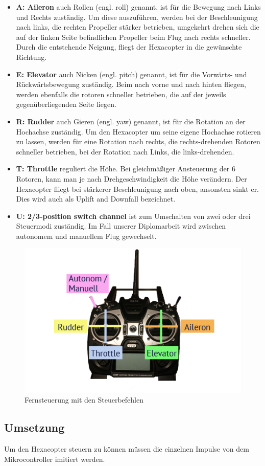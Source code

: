       \begin{itemize}
        \item \textbf{A: Aileron} auch Rollen (engl. roll) genannt, ist für die Bewegung nach Links und Rechts zuständig.
        Um diese auszuführen, werden bei der Beschleunigung nach links, die rechten Propeller stärker betrieben, umgekehrt drehen sich die auf der linken Seite befindlichen Propeller beim Flug nach rechts schneller. Durch die entstehende Neigung, fliegt der Hexacopter in die gewünschte Richtung.
        \item \textbf{E: Elevator} auch Nicken (engl. pitch) genannt, ist für die Vorwärts- und Rückwärtsbewegung zuständig.
        Beim nach vorne und nach hinten fliegen, werden ebenfalls die rotoren schneller betrieben, die auf der jeweils gegenüberliegenden Seite liegen.
        \item \textbf{R: Rudder} auch Gieren (engl. yaw) genannt, ist für die Rotation an der Hochachse zuständig.
        Um den Hexacopter um seine eigene Hochachse rotieren zu lassen, werden für eine Rotation nach rechts, die rechts-drehenden Rotoren schneller betrieben, bei der Rotation nach Links, die links-drehenden.
        \item \textbf{T: Throttle} reguliert die Höhe.
        Bei gleichmäßiger Ansteuerung der 6 Rotoren, kann man je nach Drehgeschwindigkeit die Höhe verändern. Der Hexacopter fliegt bei stärkerer Beschleunigung nach oben, ansonsten sinkt er. Dies wird auch als Uplift and Downfall bezeichnet.
        \item \textbf{U: 2/3-position switch channel} ist zum Umschalten von zwei oder drei Steuermodi zuständig. Im Fall unserer Diplomarbeit wird zwischen autonomem und manuellem Flug gewechselt. \cite{positionswitch}
      \end{itemize}

    \begin{figure}[H]
      \begin{centering}
        \includegraphics[width = \textwidth]{Bilder/bor_fernbedienung}
      \par\end{centering}
      \caption{Fernsteuerung mit den Steuerbefehlen}
      \label{Fernsteuerung}
    \end{figure}

  \subsection{Umsetzung}
  Um den Hexacopter steuern zu können müssen die einzelnen Impulse von dem Mikrocontroller imitiert werden.